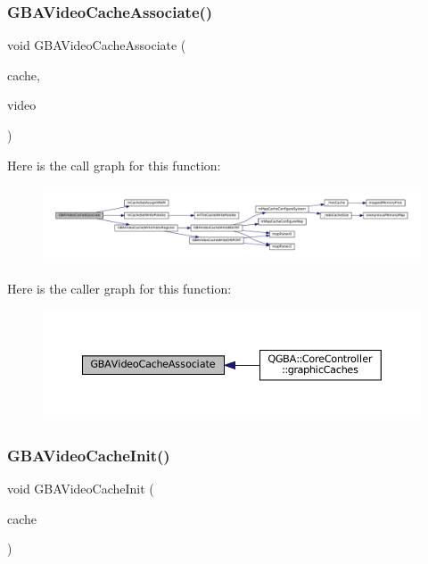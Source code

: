 \subsubsection{\texorpdfstring{G\+B\+A\+Video\+Cache\+Associate()}{GBAVideoCacheAssociate()}}
{\footnotesize\ttfamily void G\+B\+A\+Video\+Cache\+Associate (\begin{DoxyParamCaption}\item[{struct m\+Cache\+Set $\ast$}]{cache,  }\item[{struct G\+B\+A\+Video $\ast$}]{video }\end{DoxyParamCaption})}

Here is the call graph for this function\+:
\nopagebreak
\begin{figure}[H]
\begin{center}
\leavevmode
\includegraphics[width=350pt]{gba_2renderers_2cache-set_8c_a79fa3e44bb9733bf6fc6cc35d3759e53_cgraph}
\end{center}
\end{figure}
Here is the caller graph for this function\+:
\nopagebreak
\begin{figure}[H]
\begin{center}
\leavevmode
\includegraphics[width=350pt]{gba_2renderers_2cache-set_8c_a79fa3e44bb9733bf6fc6cc35d3759e53_icgraph}
\end{center}
\end{figure}
\mbox{\label{gba_2renderers_2cache-set_8c_a19731671a169a93b76c08671ee5ae0d9}} 
\subsubsection{\texorpdfstring{G\+B\+A\+Video\+Cache\+Init()}{GBAVideoCacheInit()}}
{\footnotesize\ttfamily void G\+B\+A\+Video\+Cache\+Init (\begin{DoxyParamCaption}\item[{struct m\+Cache\+Set $\ast$}]{cache }\end{DoxyParamCaption})}

